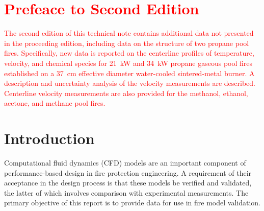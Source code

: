 \documentclass[12pt]{article}
\begin{document}

\begin{multicols}{2}
\printnomenclature
\end{multicols}

\clearpage
\section*{\textcolor{red}{Prefeace to Second Edition}}
\textcolor{red}{The second edition of this technical note contains additional data not presented in the proceeding edition, including data on the structure of two propane pool fires. Specifically, new data is reported on the centerline profiles of temperature, velocity, and chemical species for \textcolor{red}{21~kW} and 34~kW propane gaseous pool fires established on a 37~cm effective diameter water-cooled sintered-metal burner. A description and uncertainty analysis of the velocity measurements are described. Centerline velocity measurements are also provided for the methanol, ethanol, acetone, and methane pool fires.}

\clearpage

\section{Introduction}
\label{sec:intro}
Computational fluid dynamics (CFD) models are an important component of performance-based design in fire protection engineering. A requirement of their acceptance in the design process is that these models be verified and validated, the latter of which involves comparison with experimental measurements. The primary objective of this report is to provide data for use in fire model validation.
\end{document}
